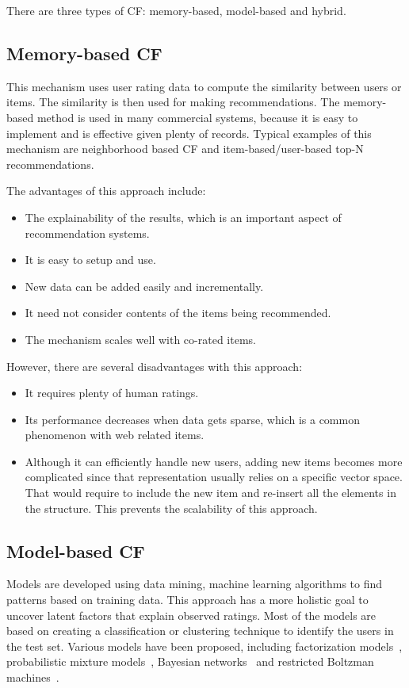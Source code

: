 There are three types of CF: memory-based, model-based and hybrid.

\hspace{0.05in}
\subsection{Memory-based CF}
This mechanism uses user rating data to compute the similarity between users or items. The similarity is then used for making recommendations. The memory-based method is used in many commercial systems, because it is easy to implement and is effective given plenty of records. Typical examples of this mechanism are neighborhood based CF and item-based/user-based top-N recommendations\cite{su2009survey}.

The advantages of this approach include:
\begin{itemize}
\item The explainability of the results, which is an important aspect of recommendation systems.
\item It is easy to setup and use.
\item New data can be added easily and incrementally.
\item It need not consider contents of the items being recommended.
\item The mechanism scales well with co-rated items.
\end{itemize}

However, there are several disadvantages with this approach:
\begin{itemize}
\item It requires plenty of human ratings.
\item Its performance decreases when data gets sparse, which is a common phenomenon with web related items.
\item Although it can efficiently handle new users, adding new items becomes more complicated since that representation usually relies on a specific vector space. That would require to include the new item and re-insert all the elements in the structure. This prevents the scalability of this approach.
\end{itemize}

\hspace{0.05in}
\subsection{Model-based CF}
Models are developed using data mining, machine learning algorithms to find patterns based on training data. This approach has a more holistic goal to uncover latent factors that explain observed ratings. Most of the models are based on creating a classification or clustering technique to identify the users in the test set.
Various models have been proposed, including factorization models~\cite{/computer/yehuda09matrix, /aaai/WPan12,paterek07,/tist/LibFM-TIST12},
probabilistic mixture models~\cite{hofmann04cf,jin:decoupled}, Bayesian networks~\cite{pennock00pd} and restricted Boltzman machines~\cite{/icml/SalakhutdinovMH07}.

